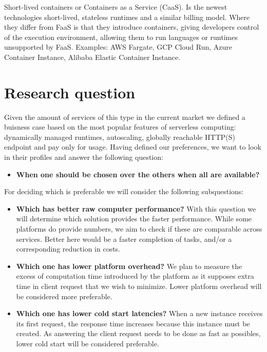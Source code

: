 \documentclass[11pt]{article}
\begin{document}
Short-lived containers or Containers as a Service (CaaS). Is the newest technologies short-lived, stateless runtimes and a similar billing model. Where they differ from FaaS is that they introduce containers, giving developers control of the execution environment, allowing them to run languages or runtimes unsupported by FaaS. Examples: AWS Fargate, GCP Cloud Run, Azure Container Instance, Alibaba Elastic Container Instance.


\section{Research question}

Given the amount of services of this type in the current market we defined a buisness case based on the most popular features \cite{popular1} of serverless computing: dynamically managed runtimes, autoscaling, globally reachable HTTP(S) endpoint and pay only for usage. Having defined our preferences, we want to look in their profiles and answer the following question:

\begin{itemize}
\item \textbf{When one should be chosen over the others when all are available?}
\end{itemize}

For deciding which is preferable we will consider the following subquestions:

\begin{itemize}
\item \textbf{Which has better raw computer performance?} With this question we will determine which solution provides the faster performance. While some platforms do provide numbers, we aim to check if these are comparable across services. Better here would be a faster completion of tasks, and/or a corresponding reduction in costs.

\item \textbf{Which one has lower platform overhead?}  We plan to measure the excess of computation time introduced by the platform as it supposes extra time in client request that we wish to minimize. Lower platform overhead will be considered more preferable.

\item \textbf{Which one has lower cold start latencies?} When a new instance receives its first request, the response time increases because this instance must be created. As answering the client request needs to be done as fast as possibles, lower cold start will be considered preferable.
\end{itemize}
\end{document}
